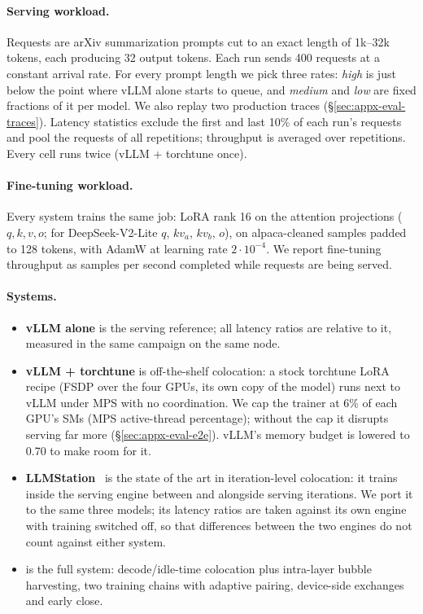 \paragraph{Serving workload.}
Requests are arXiv summarization prompts cut to an exact length of
1k--32k tokens, each producing 32 output tokens. Each run sends 400 requests
at a constant arrival rate. For every prompt length we pick three rates:
\emph{high} is just below the point where vLLM alone starts to queue, and
\emph{medium} and \emph{low} are fixed fractions of it per model. We also
replay two production traces (\S\ref{sec:appx-eval-traces}). Latency statistics
exclude the first and last 10\% of each run's requests and pool the
requests of all repetitions; throughput is averaged over repetitions.
Every cell runs twice (vLLM + torchtune once).

\paragraph{Fine-tuning workload.}
Every system trains the same job: LoRA rank 16 on the attention
projections ($q,k,v,o$; for DeepSeek-V2-Lite $q$, $kv_a$, $kv_b$, $o$), on
alpaca-cleaned samples padded to 128 tokens, with AdamW at learning rate
$2\cdot10^{-4}$. We report fine-tuning throughput as samples per second
completed while requests are being served.

\paragraph{Systems.}
\begin{itemize}
  \item \textbf{vLLM alone} is the serving reference; all latency ratios are
    relative to it, measured in the same campaign on the same node.
  \item \textbf{vLLM + torchtune} is off-the-shelf colocation: a stock
    torchtune LoRA recipe (FSDP over the four GPUs, its own copy of the model)
    runs next to vLLM under MPS with no coordination. We cap the trainer at
    6\% of each GPU's \acp{SM} (MPS active-thread percentage); without the
    cap it disrupts serving far more (\S\ref{sec:appx-eval-e2e}).
    vLLM's memory budget is lowered to 0.70 to make room for it.
  \item \textbf{LLMStation}~\cite{llmstation} is the state of the art in
    iteration-level colocation: it trains inside the serving engine between
    and alongside serving iterations. We port it to the same three models; its
    latency ratios are taken against its own engine with training switched
    off, so that differences between the two engines do not count against
    either system.
  \item \textbf{\sys{}} is the full system: decode/idle-time colocation
    plus intra-layer bubble harvesting, two training chains with adaptive
    pairing, device-side exchanges and early close.
\end{itemize}

